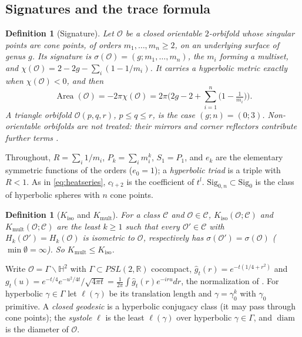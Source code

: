 \documentclass[pdflatex,sn-mathphys-num]{sn-jnl}
\theoremstyle{thmstyleone}%
\theoremstyle{thmstylethree}%
\newtheorem{definition}[theorem]{Definition}%
\newcommand{\Orb}{\mathcal{O}}
\newcommand{\Cl}{\mathcal{C}}
\newcommand{\Sig}{\mathrm{Sig}}
\newcommand{\Kiso}{K_{\mathrm{iso}}}
\newcommand{\Kmult}{K_{\mathrm{mult}}}
\newcommand{\Area}{\operatorname{Area}}
\newcommand{\diam}{\operatorname{diam}}
\newcommand{\R}{\mathbb{R}}
\begin{document}
\subsection{Signatures and the trace formula}\label{sec:trace}

\begin{definition}[Signature]\label{def:signature}
Let $\Orb$ be a closed orientable $2$-orbifold whose singular points are cone points, of orders $m_1,\dots,m_n\ge2$, on an underlying surface of genus $g$. Its \emph{signature} is $\sigma(\Orb)=(g;m_1,\dots,m_n)$, the $m_i$ forming a multiset, and $\chi(\Orb)=2-2g-\sum_i(1-1/m_i)$. It carries a hyperbolic metric exactly when $\chi(\Orb)<0$, and then \cite[formulas 13.3.4--13.3.5, Thm~13.3.6]{thurston1980}
\begin{equation}\label{eq:area}
  \Area(\Orb)=-2\pi\chi(\Orb)=2\pi\Big(2g-2+\sum_{i=1}^n\big(1-\tfrac1{m_i}\big)\Big).
\end{equation}
A \emph{triangle orbifold} $\Orb(p,q,r)$, $p\le q\le r$, is the case $(g;n)=(0;3)$. Non-orientable orbifolds are not treated: their mirrors and corner reflectors contribute further terms \cite[(5.8), (5.11)--(5.12)]{dggw2008}.
\end{definition}

Throughout, $R=\sum_i1/m_i$, $P_k=\sum_im_i^k$, $S_1=P_1$, and $e_k$ are the elementary symmetric functions of the orders ($e_0=1$); a \emph{hyperbolic triad} is a triple with $R<1$. As in \eqref{eq:heatseries}, $c_{l+2}$ is the coefficient of $t^l$. $\Sig_{0,n}\subset\Sig_0$ is the class of hyperbolic spheres with $n$ cone points.

\begin{definition}[$\Kiso$ and $\Kmult$]\label{def:K}
For a class $\Cl$ and $\Orb\in\Cl$, $\Kiso(\Orb;\Cl)$ and $\Kmult(\Orb;\Cl)$ are the least $k\ge1$ such that every $\Orb'\in\Cl$ with $H_k(\Orb')=H_k(\Orb)$ is isometric to $\Orb$, respectively has $\sigma(\Orb')=\sigma(\Orb)$ ($\min\emptyset=\infty$). So $\Kmult\le\Kiso$.
\end{definition}

Write $\Orb=\Gamma\backslash\mathbb H^2$ with $\Gamma\subset PSL(2,\R)$ cocompact, $\hat g_t(r)=e^{-t(1/4+r^2)}$ and $g_t(u)=e^{-t/4}e^{-u^2/4t}/\sqrt{4\pi t}=\frac1{2\pi}\int\hat g_t(r)e^{-iru}dr$, the normalization of \cite[Rems~2.6--2.7]{garbinjorgenson2020}. For hyperbolic $\gamma\in\Gamma$ let $\ell(\gamma)$ be its translation length and $\gamma=\gamma_0^k$ with $\gamma_0$ primitive. A \emph{closed geodesic} is a hyperbolic conjugacy class (it may pass through cone points); the \emph{systole} $\ell$ is the least $\ell(\gamma)$ over hyperbolic $\gamma\in\Gamma$, and $\diam$ is the diameter of $\Orb$.
\end{document}
